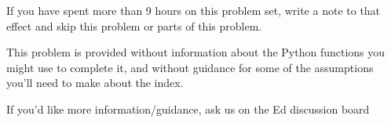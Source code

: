 \documentclass[12pt,letterpaper,noanswers]{exam}
\begin{document}
\begin{questions}
\begin{parts}
\item If you have spent more than 9 hours on this problem set, write a note to that effect and skip this problem or parts of this problem.  

\end{parts}


This problem is provided without information about the Python functions you might use to complete it, and without guidance for some of the assumptions you'll need to make about the index.  

If you'd like more information/guidance, ask us on the Ed discussion board


\end{questions}





\end{document}
